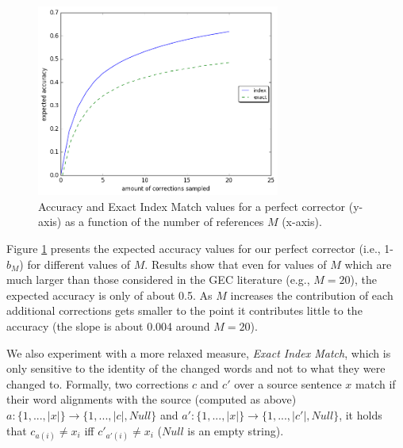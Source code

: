 \documentclass[letter,11pt]{article}
\begin{document}
\begin{figure}
	\vspace{-1em}
  \includegraphics[width=8cm]{noSig_repeat_1000_accuracy}
  \caption{Accuracy and Exact Index Match values for a perfect corrector (y-axis)
    as a function of the number of references $M$ (x-axis).
  } \label{fig:accuracy_vals}
  \vspace{-0.5cm}
\end{figure}

Figure \ref{fig:accuracy_vals} presents the expected accuracy values for our perfect
corrector (i.e., 1-$\hat{b}_M$) for different values of $M$. 
Results show that even for values of $M$ which are much larger than those considered in the GEC literature (e.g., $M=20$),
the expected accuracy is only of about 0.5. As $M$ increases the contribution of each additional corrections
  gets smaller to the point it contributes little to the accuracy (the slope is about 0.004 around $M=20$).

We also experiment with a more relaxed measure, {\it Exact Index Match}, which is only sensitive
to the identity of the changed words and not to what they were changed to. 
Formally, two corrections $c$ and $c'$ over a source sentence $x$ match
if their word alignments with the source (computed as above) $a:\{1,...,\left|x\right|\} \rightarrow \{1,...,\left|c\right|,Null\}$
and $a':\{1,...,\left|x\right|\} \rightarrow \{1,...,\left|c'\right|,Null\}$, it holds that $c_{a\left(i\right)} \neq x_{i}$ iff $c'_{a'\left(i\right)} \neq x_{i}$ ($Null$ is an empty string).
\end{document}
